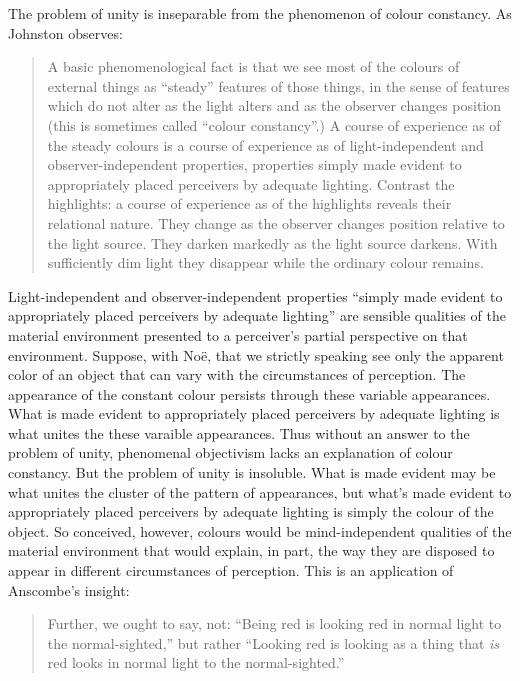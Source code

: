 \documentclass[12pt]{article}
\begin{document}
The problem of unity is inseparable from the phenomenon of colour constancy. As Johnston observes: 
	\begin{quote}
		A basic phenomenological fact is that we see most of the colours of external things as ``steady'' features of those things, in the sense of features which do not alter as the light alters and as the observer changes position (this is sometimes called ``colour constancy''.) A course of experience as of the steady colours is a course of experience as of light-independent and observer-independent properties, properties simply made evident to appropriately placed perceivers by adequate lighting. Contrast the highlights: a course of experience as of the highlights reveals their relational nature. They change as the observer changes position relative to the light source. They darken markedly as the light source darkens. With sufficiently dim light they disappear while the ordinary colour remains. \citep[141]{Johnston:1992ck} 
	\end{quote}
Light-independent and observer-independent properties ``simply made evident to appropriately placed perceivers by adequate lighting'' are sensible qualities of the material environment presented to a perceiver's partial perspective on that environment. Suppose, with Noë, that we strictly speaking see only the apparent color of an object that can vary with the circumstances of perception. The appearance of the constant colour persists through these variable appearances. What is made evident to appropriately placed perceivers by adequate lighting is what unites the these varaible appearances. Thus without an answer to the problem of unity, phenomenal objectivism lacks an explanation of colour constancy. But the problem of unity is insoluble. What is made evident may be what unites the cluster of the pattern of appearances, but what's made evident to appropriately placed perceivers by adequate lighting is simply the colour of the object. So conceived, however, colours would be mind-independent qualities of the material environment that would explain, in part, the way they are disposed to appear in different circumstances of perception. This is an application of Anscombe's insight: 
	\begin{quote}
		Further, we ought to say, not: ``Being red is looking red in normal light to the normal-sighted,'' but rather ``Looking red is looking as a thing that \emph{is} red looks in normal light to the normal-sighted.'' \citep[14]{Anscombe:1981fk} 
\end{quote}
\end{document}
